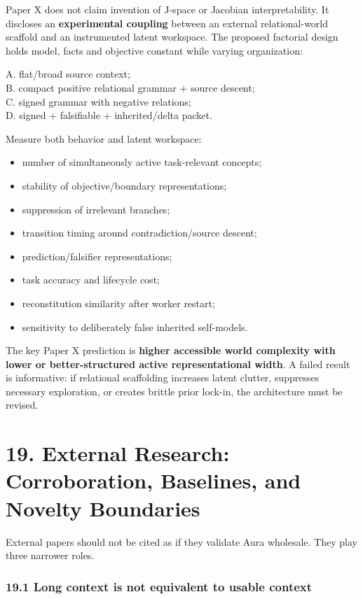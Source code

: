 \documentclass[
  10pt,
  letterpaper,
]{article}
\providecommand{\tightlist}{%
  \setlength{\itemsep}{0pt}\setlength{\parskip}{0pt}}
\begin{document}
Paper X does not claim invention of J-space or Jacobian
interpretability. It discloses an \textbf{experimental coupling} between
an external relational-world scaffold and an instrumented latent
workspace. The proposed factorial design holds model, facts and
objective constant while varying organization:

A. flat/broad source context;\\
B. compact positive relational grammar + source descent;\\
C. signed grammar with negative relations;\\
D. signed + falsifiable + inherited/delta packet.

Measure both behavior and latent workspace:

\begin{itemize}
\tightlist
\item
  number of simultaneously active task-relevant concepts;
\item
  stability of objective/boundary representations;
\item
  suppression of irrelevant branches;
\item
  transition timing around contradiction/source descent;
\item
  prediction/falsifier representations;
\item
  task accuracy and lifecycle cost;
\item
  reconstitution similarity after worker restart;
\item
  sensitivity to deliberately false inherited self-models.
\end{itemize}

The key Paper X prediction is \textbf{higher accessible world complexity
with lower or better-structured active representational width}. A failed
result is informative: if relational scaffolding increases latent
clutter, suppresses necessary exploration, or creates brittle prior
lock-in, the architecture must be revised.

\section{19. External Research: Corroboration, Baselines, and Novelty
Boundaries}\label{19-external-research-corroboration-baselines-and-novelty-boundaries}

External papers should not be cited as if they validate Aura wholesale.
They play three narrower roles.

\subsubsection{19.1 Long context is not equivalent to usable
context}\label{191-long-context-is-not-equivalent-to-usable-context}
\end{document}
